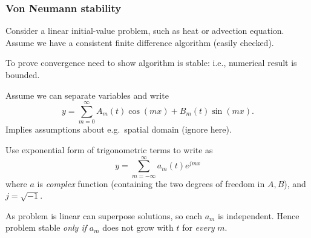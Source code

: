 \documentclass{beamer}
\begin{document}
\begin{frame}
  \frametitle{Von Neumann stability}

  \begin{overlayarea}{\textwidth}{0.8\textheight}
    {
      Consider a linear initial-value problem, such as heat or
      advection equation.  Assume we have a consistent finite
      difference algorithm (easily checked).
    }
    {

      \vspace{1ex}

      To prove convergence need to show algorithm is
      stable: i.e., numerical result is bounded.
    }
    {
      Assume we can separate variables and write
      \begin{equation*}
        y = \sum_{m = 0}^{\infty} A_{m}(t) \cos (m x) +
        B_{m}(t) \sin (m x).
      \end{equation*}
    }
    {
      Implies assumptions about e.g.\ spatial domain (ignore here).
    }
    {

      \vspace{1ex}

      Use exponential form of trigonometric terms to
      write as
      \begin{equation*}
        y = \sum_{m = -\infty}^{\infty} a_{m}(t) e^{j m x}
      \end{equation*}
      where $a$ is \emph{complex} function (containing the
      two degrees of freedom in $A,B$), and $j = \sqrt{-1}$.
    }
    {

      \vspace{1ex}

      As problem is linear can superpose solutions, so each
      $a_{m}$ is independent. Hence problem stable \emph{only
        if} $a_{m}$ does not grow with $t$ for \emph{every}
      $m$.  }
  \end{overlayarea}

\end{frame}
\end{document}
